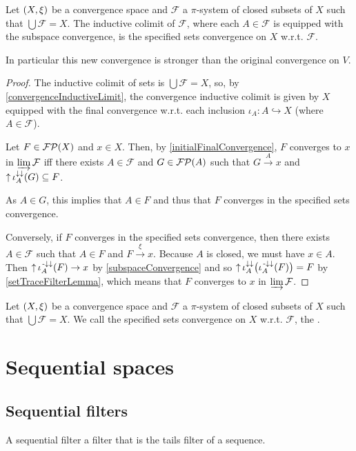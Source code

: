 \begin{proposition}
Let $\left( X,\xi \right)$ be a convergence space and $\mathcal{F}$ a $\pi$-system of closed subsets of $X$ such that $\bigcup \mathcal{F} = X$. The inductive colimit of $\mathcal{F}$, where each $A\in \mathcal{F}$ is equipped with the subspace convergence, is the specified sets convergence on $X$ w.r.t. $\mathcal{F}$.
\end{proposition}
In particular this new convergence is stronger than the original convergence on $V$.
\begin{proof}
The inductive colimit of sets is $\bigcup \mathcal{F} = X$, so, by \ref{convergenceInductiveLimit}, the convergence inductive colimit is given by $X$ equipped with the final convergence w.r.t. each inclusion $\iota_A: A\hookrightarrow X$ (where $A\in \mathcal{F}$).

Let $F\in\operatorname{\mathcal{FP}}(X)$ and $x\in X$. Then, by \ref{initialFinalConvergence}, $F$ converges to $x$ in $\varinjlim \mathcal{F}$ iff there exists $A\in \mathcal{F}$ and $G \in \operatorname{\mathcal{FP}}(A)$ such that $G\overset{A}{\longrightarrow} x$ and $\operatorname{\uparrow}\iota_A^{\downarrow\downarrow}(G) \subseteq F$.

As $A\in G$, this implies that $A\in F$ and thus that $F$ converges in the specified sets convergence.

Conversely, if $F$ converges in the specified sets convergence, then there exists $A\in \mathcal{F}$ such that $A \in F$ and $F\overset{\xi}{\longrightarrow} x$. Because $A$ is closed, we must have $x\in A$. Then $\operatorname{\uparrow}\iota_A^{{\text{\hspace{0.15em}-}\downarrow}\downarrow}(F) \to x$ by \ref{subspaceConvergence} and so $\operatorname{\uparrow}\iota_A^{\downarrow\downarrow}\big(\iota_A^{{\text{\hspace{0.15em}-}\downarrow}\downarrow}(F)\big) = F$ by \ref{setTraceFilterLemma}, which means that $F$ converges to $x$ in $\varinjlim \mathcal{F}$.
\end{proof}

\begin{definition}
Let $\left( X,\xi \right)$ be a convergence space and $\mathcal{F}$ a $\pi$-system of closed subsets of $X$ such that $\bigcup \mathcal{F} = X$. We call the specified sets convergence on $X$ w.r.t. $\mathcal{F}$, the .
\end{definition}

\chapter{Sequential spaces}

\section{Sequential filters}
A sequential filter a filter that is the tails filter of a sequence.

